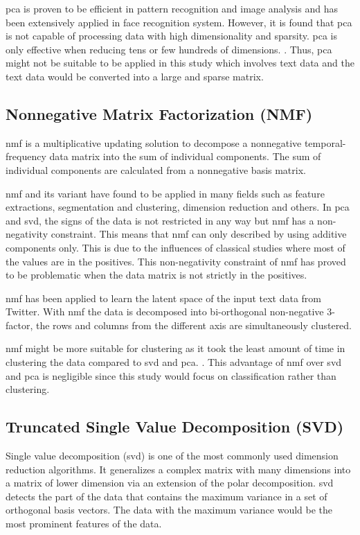 \Ac{pca} is proven to be efficient in pattern recognition and image analysis and has been extensively applied in face recognition system. However, it is found that \ac{pca} is not capable of processing data with high dimensionality and sparsity. \ac{pca} is only effective when reducing tens or few hundreds of dimensions. \cite{dimRedCat}. Thus, \ac{pca} might not be suitable to be applied in this study which involves text data and the text data would be converted into a large and sparse matrix.\\

\subsection{Nonnegative Matrix Factorization (NMF)}
\Ac{nmf} is a multiplicative updating solution to decompose a nonnegative temporal-frequency data matrix into the sum of individual components. The sum of individual components are calculated from a nonnegative basis matrix. \cite{nmfBook}

\Ac{nmf} and its variant have found to be applied in many fields such as feature extractions, segmentation and clustering, dimension reduction and others. In \ac{pca} and \ac{svd}, the signs of the data is not restricted in any way but \ac{nmf} has a non-negativity constraint. This means that \ac{nmf} can only described by using additive components only. This is due to the influences of classical studies where most of the values are in the positives. This non-negativity constraint of \ac{nmf} has proved to be problematic when the data matrix is not strictly in the positives. \cite{semiNmfPca}

\Ac{nmf} has been applied to learn the latent space of the input text data from Twitter. With \ac{nmf} the data is decomposed into bi-orthogonal non-negative 3-factor, the rows and columns from the different axis are simultaneously clustered. \cite{nmfTwitter}

\Ac{nmf} might be more suitable for clustering as it took the least amount of time in clustering the data compared to \ac{svd} and \ac{pca}. \cite{nmfClustering}. This advantage of \ac{nmf} over \ac{svd} and \ac{pca} is negligible since this study would focus on classification rather than clustering.\\

\clearpage
\subsection{Truncated Single Value Decomposition (SVD)}
Single value decomposition (\ac{svd}) is one of the most commonly used dimension reduction algorithms. It generalizes a complex matrix with many dimensions into a matrix of lower dimension via an extension of the polar decomposition. \Ac{svd} detects the part of the data that contains the maximum variance in a set of orthogonal basis vectors. The data with the maximum variance would be the most prominent features of the data. \cite{svdDef}

